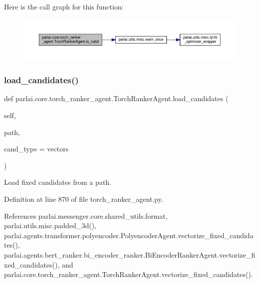 Here is the call graph for this function\+:
\nopagebreak
\begin{figure}[H]
\begin{center}
\leavevmode
\includegraphics[width=350pt]{classparlai_1_1core_1_1torch__ranker__agent_1_1TorchRankerAgent_a3a80c3eb68b019859da2a83706c3844d_cgraph}
\end{center}
\end{figure}
\mbox{\label{classparlai_1_1core_1_1torch__ranker__agent_1_1TorchRankerAgent_a353991d201d8889c453bf72c15ec78a9}} 
\subsubsection{\texorpdfstring{load\+\_\+candidates()}{load\_candidates()}}
{\footnotesize\ttfamily def parlai.\+core.\+torch\+\_\+ranker\+\_\+agent.\+Torch\+Ranker\+Agent.\+load\+\_\+candidates (\begin{DoxyParamCaption}\item[{}]{self,  }\item[{}]{path,  }\item[{}]{cand\+\_\+type = {\ttfamily \textquotesingle{}vectors\textquotesingle{}} }\end{DoxyParamCaption})}

\begin{DoxyVerb}Load fixed candidates from a path.\end{DoxyVerb}
 

Definition at line 870 of file torch\+\_\+ranker\+\_\+agent.\+py.



References parlai.\+messenger.\+core.\+shared\+\_\+utils.\+format, parlai.\+utils.\+misc.\+padded\+\_\+3d(), parlai.\+agents.\+transformer.\+polyencoder.\+Polyencoder\+Agent.\+vectorize\+\_\+fixed\+\_\+candidates(), parlai.\+agents.\+bert\+\_\+ranker.\+bi\+\_\+encoder\+\_\+ranker.\+Bi\+Encoder\+Ranker\+Agent.\+vectorize\+\_\+fixed\+\_\+candidates(), and parlai.\+core.\+torch\+\_\+ranker\+\_\+agent.\+Torch\+Ranker\+Agent.\+vectorize\+\_\+fixed\+\_\+candidates().

